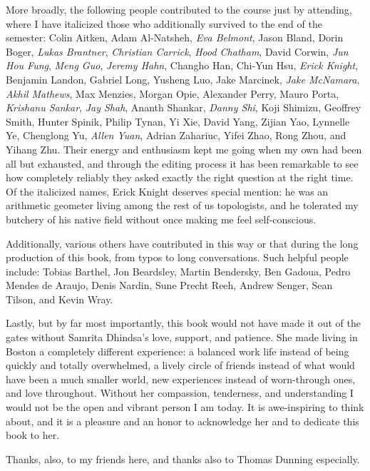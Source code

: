 More broadly, the following people contributed to the course just by attending, where I have italicized those who additionally survived to the end of the semester: Colin Aitken, Adam Al-Natsheh, \textit{Eva Belmont}, Jason Bland, Dorin Boger, \textit{Lukas Brantner}, \textit{Christian Carrick}, \textit{Hood Chatham}, David Corwin, \textit{Jun Hou Fung}, \textit{Meng Guo}, \textit{Jeremy Hahn}, Changho Han, Chi-Yun Hsu, \textit{Erick Knight}, Benjamin Landon, Gabriel Long, Yusheng Luo, Jake Marcinek, \textit{Jake McNamara}, \textit{Akhil Mathews}, Max Menzies, Morgan Opie, Alexander Perry, Mauro Porta, \textit{Krishanu Sankar}, \textit{Jay Shah}, Ananth Shankar, \textit{Danny Shi}, Koji Shimizu, Geoffrey Smith, Hunter Spinik, Philip Tynan, Yi Xie, David Yang, Zijian Yao, Lynnelle Ye, Chenglong Yu, \textit{Allen Yuan}, Adrian Zahariuc, Yifei Zhao, Rong Zhou, and Yihang Zhu.  Their energy and enthusiasm kept me going when my own had been all but exhausted, and through the editing process it has been remarkable to see how completely reliably they asked exactly the right question at the right time.  Of the italicized names, Erick Knight deserves special mention: he was an arithmetic geometer living among the rest of us topologists, and he tolerated my butchery of his native field without once making me feel self-conscious.

Additionally, various others have contributed in this way or that during the long production of this book, from typos to long conversations.  Such helpful people include: Tobias Barthel, Jon Beardsley, Martin Bendersky, Ben Gadoua, Pedro Mendes de Araujo, Denis Nardin, Sune Precht Reeh, Andrew Senger, Sean Tilson, and Kevin Wray.

Lastly, but by far most importantly, this book would not have made it out of the gates without Samrita Dhindsa's love, support, and patience.  She made living in Boston a completely different experience: a balanced work life instead of being quickly and totally overwhelmed, a lively circle of friends instead of what would have been a much smaller world, new experiences instead of worn-through ones, and love throughout.  Without her compassion, tenderness, and understanding I would not be the open and vibrant person I am today.  It is awe-inspiring to think about, and it is a pleasure and an honor to acknowledge her and to dedicate this book to her.

Thanks, also, to my friends here, and thanks also to Thomas Dunning especially.
